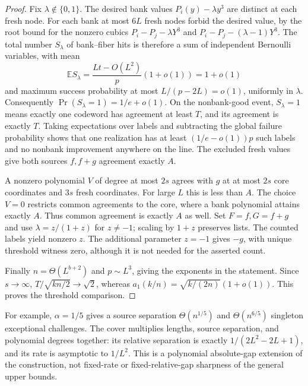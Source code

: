 \begin{proof}
Fix $\lambda\notin\{0,1\}$. The desired bank values
$P_i(y)-\lambda y^3$ are distinct at each fresh node.
For each bank at most $6L$ fresh nodes forbid the desired value,
by the root bound for the nonzero cubics
$P_i-P_j-\lambda Y^3$ and $P_i-P_j-(\lambda-1)Y^3$.
The total number $S_\lambda$ of bank--fiber hits is therefore a sum of
independent Bernoulli variables, with mean
\[
 \mathbb E S_\lambda=\frac{Lt-O(L^2)}p(1+o(1))=1+o(1)
\]
and maximum success probability at most $L/(p-2L)=o(1)$, uniformly
in $\lambda$. Consequently $\Pr(S_\lambda=1)=1/e+o(1)$.
On the nonbank-good event, $S_\lambda=1$ means exactly one codeword
has agreement at least $T$, and its agreement is exactly $T$.
Taking expectations over labels and subtracting the global failure
probability shows that one realization has at least $(1/e-o(1))p$
such labels and no nonbank improvement anywhere on the line.
The excluded fresh values give both sources $f,f+g$ agreement exactly $A$.

A nonzero polynomial $V$ of degree at most $2s$ agrees with $g$ at
at most $2s$ core coordinates and $3s$ fresh coordinates.
For large $L$ this is less than $A$. The choice $V=0$ restricts common
agreements to the core, where a bank polynomial attains exactly $A$.
Thus common agreement is exactly $A$ as well.
Set $F=f,G=f+g$ and use $\lambda=z/(1+z)$ for $z\ne-1$;
scaling by $1+z$ preserves lists. The counted labels yield nonzero $z$.
The additional parameter $z=-1$ gives $-g$, with unique threshold
witness zero, although it is not needed for the asserted count.

Finally $n=\Theta(L^{b+2})$ and $p\sim L^3$, giving the exponents
in the statement. Since $s\to\infty$,
$T/\sqrt{kn/2}\to\sqrt2$, whereas
$a_1(k/n)=\sqrt{k/(2n)}(1+o(1))$.
This proves the threshold comparison.
\end{proof}

\begin{remark}
For example, $\alpha=1/5$ gives a source separation $\Theta(n^{1/5})$
and $\Theta(n^{6/5})$ singleton exceptional challenges.
The cover multiplies lengths, source separation, and polynomial degrees
together: its relative separation is exactly $1/(2L^2-2L+1)$,
and its rate is asymptotic to $1/L^2$. This is a polynomial absolute-gap
extension of the construction, not fixed-rate or fixed-relative-gap
sharpness of the general upper bounds.
\end{remark}
